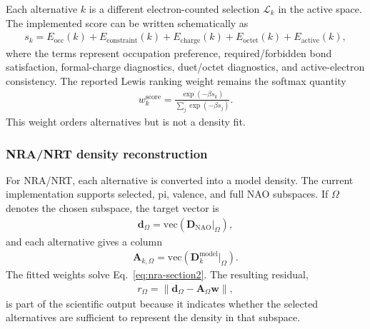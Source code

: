 \documentclass[11pt]{article}
\newcommand{\nao}{\mathrm{NAO}}
\newcommand{\dens}{\mathbf{D}}
\begin{document}
Each alternative $k$ is a different electron-counted selection $\mathcal{L}_k$ in the active space.  The implemented score can be written schematically as
\begin{equation}
\begin{aligned}
	s_k
	= E_{\mathrm{occ}}(k)
	+ E_{\mathrm{constraint}}(k)
	+ E_{\mathrm{charge}}(k)
	+ E_{\mathrm{octet}}(k)
	+ E_{\mathrm{active}}(k),
\end{aligned}
\end{equation}
where the terms represent occupation preference, required/forbidden bond satisfaction, formal-charge diagnostics, duet/octet diagnostics, and active-electron consistency.  The reported Lewis ranking weight remains the softmax quantity
\begin{equation}
\begin{aligned}
	w_k^{\mathrm{score}}
	= \frac{\exp(-\beta s_k)}{\sum_j \exp(-\beta s_j)}.
\end{aligned}
\end{equation}
This weight orders alternatives but is not a density fit.

\subsubsection*{NRA/NRT density reconstruction}

For NRA/NRT, each alternative is converted into a model density.  The current implementation supports selected, pi, valence, and full NAO subspaces.  If $\Omega$ denotes the chosen subspace, the target vector is
\begin{equation}
\begin{aligned}
	\mathbf{d}_{\Omega} = \mathrm{vec}\left(\dens_{\nao}\big|_{\Omega}\right),
\end{aligned}
\end{equation}
and each alternative gives a column
\begin{equation}
\begin{aligned}
	\mathbf{A}_{k,\Omega}
	= \mathrm{vec}\left(\dens_k^{\mathrm{model}}\big|_{\Omega}\right).
\end{aligned}
\end{equation}
The fitted weights solve Eq.~\eqref{eq:nra-section2}.  The resulting residual,
\begin{equation}
\begin{aligned}
	r_{\Omega}=\left\|\mathbf{d}_{\Omega}-\mathbf{A}_{\Omega}\mathbf{w}\right\|,
\end{aligned}
\end{equation}
is part of the scientific output because it indicates whether the selected alternatives are sufficient to represent the density in that subspace.
\end{document}
